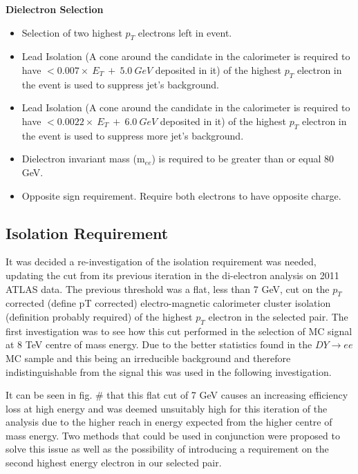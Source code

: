 {\bf Dielectron Selection}
\begin{itemize}
\item Selection of two highest $p_{T}$ electrons left in event.
\item Lead Isolation (A cone around the candidate in the calorimeter is required to have $< 0.007\times~E_{T}~+~5.0~GeV$ deposited in it) of the highest $p_{T}$ electron in the event is used to suppress jet's background. 
\item Lead Isolation (A cone around the candidate in the calorimeter is required to have $< 0.0022\times~E_{T}~+~6.0~GeV$ deposited in it) of the highest $p_{T}$ electron in the event is used to suppress more jet's background. 
\item Dielectron invariant mass (m$_{ee}$) is required to be greater than or equal 80 GeV.
\item Opposite sign requirement. Require both electrons to have opposite charge.
\end{itemize}




\subsection{Isolation Requirement}

It was decided a re-investigation of the isolation requirement was needed, updating the cut from its previous iteration in the di-electron analysis on 2011 ATLAS data. The previous threshold was a flat, less than 7 GeV, cut on the $p_{T}$ corrected (define pT corrected) electro-magnetic calorimeter cluster isolation (definition probably required) of the highest $p_{T}$ electron in the selected pair. The first investigation was to see how this cut performed in the selection of MC signal at 8 TeV centre of mass energy. Due to the better statistics found in the $DY{\rightarrow}ee$ MC sample and this being an irreducible background and therefore indistinguishable from the signal this was used in the following investigation.

It can be seen in fig. \# that this flat cut of 7 GeV causes an increasing efficiency loss at high energy and was deemed unsuitably high for this iteration of the analysis due to the higher reach in energy expected from the higher centre of mass energy. Two methods that could be used in conjunction were proposed to solve this issue as well as the possibility of introducing a requirement on the second highest energy electron in our selected pair.

